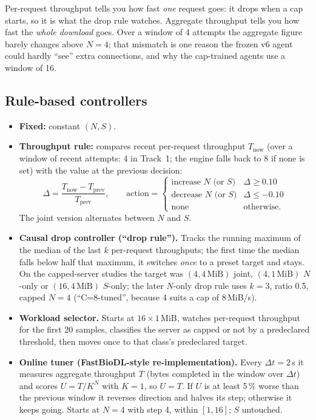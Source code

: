 \begin{doubt}
Per-request throughput tells you how fast \emph{one} request goes: it drops when a cap starts, so it is what the drop rule watches. Aggregate throughput tells you how fast the \emph{whole download} goes. Over a window of 4 attempts the aggregate figure barely changes above $N=4$; that mismatch is one reason the frozen v6 agent could hardly ``see'' extra connections, and why the cap-trained agents use a window of 16.
\end{doubt}

\subsection{Rule-based controllers}
\begin{itemize}
\item \textbf{Fixed:} constant $(N, S)$.
\item \textbf{Throughput rule:} compares recent per-request throughput $T_{\text{now}}$ (over a window of recent attempts: 4 in Track~1; the engine falls back to 8 if none is set) with the value at the previous decision:
\begin{equation}
\Delta = \frac{T_{\text{now}} - T_{\text{prev}}}{T_{\text{prev}}},\qquad
\text{action} = \begin{cases}\text{increase } N \text{ (or } S) & \Delta \ge 0.10\\ \text{decrease } N \text{ (or } S) & \Delta \le -0.10\\ \text{none} & \text{otherwise.}\end{cases}
\end{equation}
The joint version alternates between $N$ and $S$.
\item \textbf{Causal drop controller (``drop rule'').} Tracks the running maximum of the median of the last $k$ per-request throughputs; the first time the median falls below half that maximum, it switches \emph{once} to a preset target and stays. On the capped-server studies the target was $(4, 4\,\text{MiB})$ joint, $(4, 1\,\text{MiB})$ $N$-only or $(16, 4\,\text{MiB})$ $S$-only; the later $N$-only drop rule uses $k=3$, ratio 0.5, capped $N=4$ (``C=8-tuned'', because 4 suits a cap of 8\,MiB/s).
\item \textbf{Workload selector.} Starts at $16\times1$\,MiB, watches per-request throughput for the first 20 samples, classifies the server as capped or not by a predeclared threshold, then moves once to that class's predeclared target.
\item \textbf{Online tuner (FastBioDL-style re-implementation).} Every $\Delta t = 2$\,s it measures aggregate throughput $T$ (bytes completed in the window over $\Delta t$) and scores $U = T/K^N$ with $K=1$, so $U=T$. If $U$ is at least 5\,\% worse than the previous window it reverses direction and halves its step; otherwise it keeps going. Starts at $N=4$ with step 4, within $[1,16]$; $S$ untouched.
\end{itemize}

